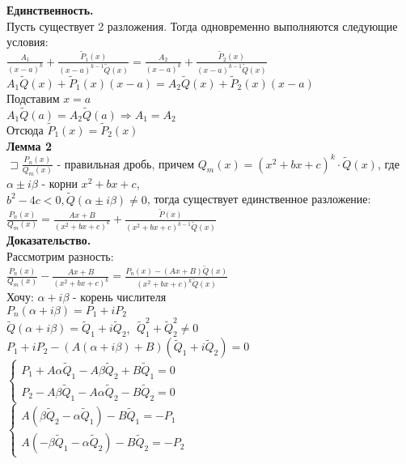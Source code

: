 \documentclass[14pt]{article}
\begin{document}
	 \textbf{Единственность.} \\
	 Пусть существует 2 разложения. Тогда одновременно выполняются следующие условия: \\
	 $\frac{A_1}{(x-a)^k}+\frac{\widetilde{P}_1(x)}{(x-a)^{k-1}\widetilde{Q}(x)} = \frac{A_2}{(x-a)^k} + \frac{\widetilde{P}_2(x)}{(x-a)^{k-1}\widetilde{Q}(x)}$ \\
	 $A_1 \widetilde{Q}(x) + \widetilde{P}_1(x)(x-a) = A_2 \widetilde{Q}(x) + \widetilde{P}_2(x)(x-a)$ \\
	 Подставим $x=a$ \\
	 $A_1\widetilde{Q}(a) = A_2 \widetilde{Q}(a) \Rightarrow A_1 = A_2$ \\
	 Отсюда $\widetilde{P}_1(x) = \widetilde{P}_2(x)$ \\
	 \textbf{Лемма 2} \\
	 $\sqsupset \frac{P_n(x)}{Q_m(x)}$ - правильная дробь, причем $Q_m(x)=(x^2 + bx + c)^k \cdot \widetilde{Q}(x)$, где $\alpha \pm i \beta$ - корни $x^2 + bx + c$, \\
	 $b^2-4c<0, \widetilde{Q}(\alpha \pm i \beta ) \neq 0$, тогда существует единственное разложение: \\
	 $\frac{P_n(x)}{Q_m(x)} = \frac{Ax+B}{(x^2+bx+c)^k} + \frac{\widetilde{P}(x)}{(x^2+bx+c)^{k-1}\widetilde{Q}(x)}$ \\
	 \textbf{Доказательство.} \\
	 Рассмотрим разность: \\
	 $\frac{P_n(x)}{Q_m(x)} - \frac{Ax+B}{(x^2+bx+c)^k} = \frac{P_n(x) - (Ax+B)\widetilde{Q}(x)}{(x^2+bx+c)^k\widetilde{Q}(x)}$ \\
	 Хочу: $\alpha + i \beta$ - корень числителя \\
	 $P_n(\alpha + i \beta) = P_1 + i P_2$ \\
	 $\widetilde{Q}(\alpha + i\beta) = \widetilde{Q}_1 + i \widetilde{Q}_2$, $\; \widetilde{Q}^2_1 + \widetilde{Q}^2_2 \neq 0$  \\
	 $P_1 + i P_2 - (A(\alpha + i \beta) + B)(\widetilde{Q}_1 + i \widetilde{Q}_2) = 0$ \\
	 $ \begin{cases}
	 	P_1 + A\alpha \widetilde{Q}_1 - A \beta \widetilde{Q}_2 + B \widetilde{Q}_1=0 \\ 
	 	P_2 - A \beta \widetilde{Q}_1 - A \alpha \widetilde{Q}_2 - B \widetilde{Q}_2 = 0
	 \end{cases}
 	$ \\
 	$\begin{cases}
 		A(\beta \widetilde{Q}_2 - \alpha \widetilde{Q}_1) - B \widetilde{Q}_1 = -P_1 \\
 		A(-\beta \widetilde{Q}_1 - \alpha \widetilde{Q}_2) - B \widetilde{Q}_2 = -P_2
 	\end{cases}$ \\
\end{document}
